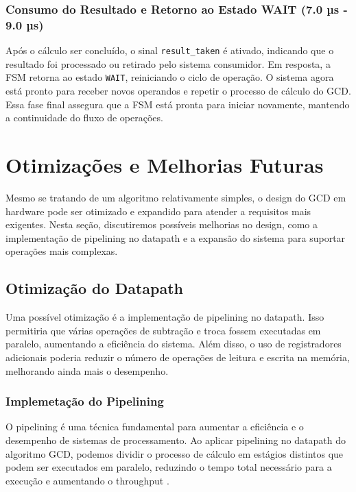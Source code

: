 \documentclass[a4paper,11pt]{article} %
\begin{document}
\subsubsection{Consumo do Resultado e Retorno ao Estado WAIT (7.0 µs - 9.0 µs)}

Após o cálculo ser concluído, o sinal \texttt{result\_taken} é ativado, indicando que o resultado foi processado ou retirado pelo sistema consumidor. Em resposta, a FSM retorna ao estado \texttt{WAIT}, reiniciando o ciclo de operação. O sistema agora está pronto para receber novos operandos e repetir o processo de cálculo do GCD. Essa fase final assegura que a FSM está pronta para iniciar novamente, mantendo a continuidade do fluxo de operações.

\section{Otimizações e Melhorias Futuras}

Mesmo se tratando de um algoritmo relativamente simples, o design do GCD em hardware pode ser otimizado e expandido para atender a requisitos mais exigentes. Nesta seção, discutiremos possíveis melhorias no design, como a implementação de pipelining no datapath e a expansão do sistema para suportar operações mais complexas.




\subsection{Otimização do Datapath}
Uma possível otimização é a implementação de pipelining no datapath. Isso permitiria que várias operações de subtração e troca fossem executadas em paralelo, aumentando a eficiência do sistema. Além disso, o uso de registradores adicionais poderia reduzir o número de operações de leitura e escrita na memória, melhorando ainda mais o desempenho.


\subsubsection{Implemetação do Pipelining}
O pipelining é uma técnica fundamental para aumentar a eficiência e o desempenho de sistemas de processamento. Ao aplicar pipelining no datapath do algoritmo GCD, podemos dividir o processo de cálculo em estágios distintos que podem ser executados em paralelo, reduzindo o tempo total necessário para a execução e aumentando o throughput \cite{Hennessy2017}.
\end{document}
